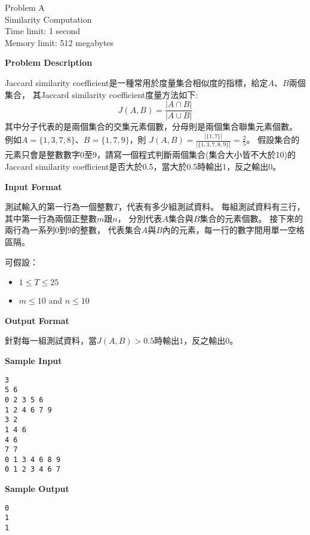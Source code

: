 \begin{center}
    {\LARGE Problem A}\vspace{1mm}\\
    {\Large Similarity Computation}\\
    {Time limit: 1 second}\\
    {Memory limit: 512 megabytes}
\end{center}

\textbf{\large Problem Description}

Jaccard similarity coefficient是一種常用於度量集合相似度的指標，給定$A$、$B$兩個集合，
其Jaccard similarity coefficient度量方法如下:
\[J(A, B)=\frac{|A\cap B|}{|A\cup B|}\]
其中分子代表的是兩個集合的交集元素個數，分母則是兩個集合聯集元素個數。
例如$A=\{1, 3, 7, 8\}$、$B=\{1, 7, 9\}$，則
$J(A, B)=\frac{|\{1, 7\}|}{|\{1, 3, 7, 8, 9\}|}=\frac{2}{5}$。
假設集合的元素只會是整數數字0至9，請寫一個程式判斷兩個集合(集合大小皆不大於10)的
Jaccard similarity coefficient是否大於0.5，當大於0.5時輸出1，反之輸出0。

\textbf{\large Input Format}

測試輸入的第一行為一個整數$T$，代表有多少組測試資料。
每組測試資料有三行，其中第一行為兩個正整數$m$跟$n$，
分別代表$A$集合與$B$集合的元素個數。
接下來的兩行為一系列$0$到$9$的整數，
代表集合$A$與$B$內的元素，每一行的數字間用單一空格區隔。

可假設：
\begin{itemize}
    \tightlist{}
    \item $1 \le T \le 25$
    \item $m\le 10$ and $n \le 10$
\end{itemize}

\textbf{\large Output Format}

針對每一組測試資料，當$J(A, B)>0.5$時輸出$1$，反之輸出$0$。

\textbf{\large Sample Input}

\begin{verbatim}
3
5 6
0 2 3 5 6
1 2 4 6 7 9
3 2
1 4 6
4 6
7 7
0 1 3 4 6 8 9
0 1 2 3 4 6 7
\end{verbatim}

\textbf{\large Sample Output}
\begin{verbatim}
0
1
1
\end{verbatim}

